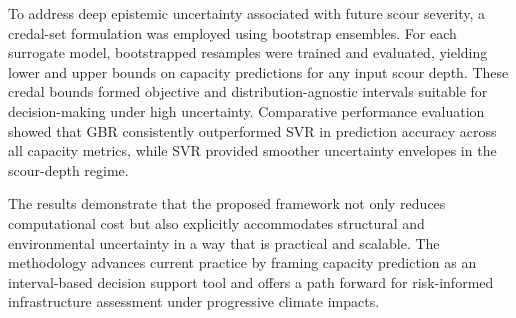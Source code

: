 \documentclass[authoryear,preprint,review,12pt]{elsarticle}
\begin{document}
To address deep epistemic uncertainty associated with future scour severity, a credal-set formulation was employed using bootstrap ensembles. For each surrogate model, bootstrapped resamples were trained and evaluated, yielding lower and upper bounds on capacity predictions for any input scour depth. These credal bounds formed objective and distribution-agnostic intervals suitable for decision-making under high uncertainty. Comparative performance evaluation showed that GBR consistently outperformed SVR in prediction accuracy across all capacity metrics, while SVR provided smoother uncertainty envelopes in the scour-depth regime.

The results demonstrate that the proposed framework not only reduces computational cost but also explicitly accommodates structural and environmental uncertainty in a way that is practical and scalable. The methodology advances current practice by framing capacity prediction as an interval-based decision support tool and offers a path forward for risk-informed infrastructure assessment under progressive climate impacts.


 

\end{document}
